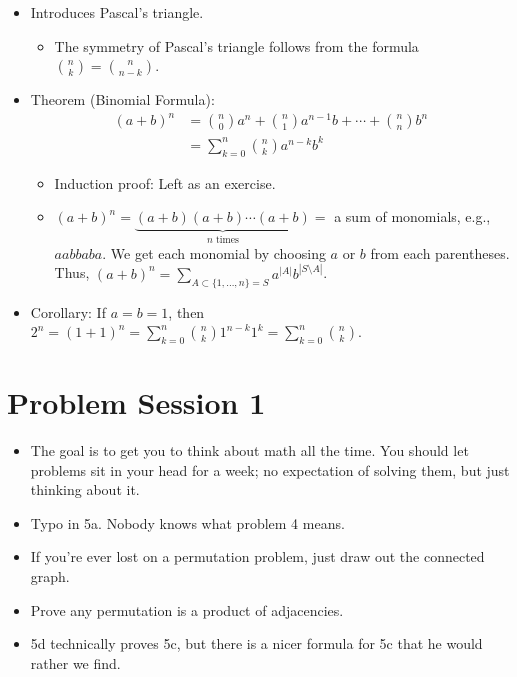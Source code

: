 \documentclass[../apprentice.tex]{subfiles}
\begin{document}
\begin{itemize}
\begin{itemize}
    \end{itemize}
    \item Introduces Pascal's triangle.
    \begin{itemize}
        \item The symmetry of Pascal's triangle follows from the formula $\binom{n}{k}=\binom{n}{n-k}$.
    \end{itemize}
    \item Theorem (Binomial Formula):
    \begin{align*}
        (a+b)^n &= \binom{n}{0}a^n+\binom{n}{1}a^{n-1}b+\cdots+\binom{n}{n}b^n\\
        &= \sum_{k=0}^n\binom{n}{k}a^{n-k}b^k
    \end{align*}
    \begin{itemize}
        \item Induction proof: Left as an exercise.
        \item $(a+b)^n=\underbrace{(a+b)(a+b)\cdots(a+b)}_{n\text{ times}}=$ a sum of monomials, e.g., $aabbaba$. We get each monomial by choosing $a$ or $b$ from each parentheses. Thus, $(a+b)^n=\sum_{A\subset\{1,\dots,n\}=S}a^{|A|}b^{|S\setminus A|}$.
    \end{itemize}
    \item Corollary: If $a=b=1$, then $2^n=(1+1)^n=\sum_{k=0}^n\binom{n}{k}1^{n-k}1^k=\sum_{k=0}^n\binom{n}{k}$.
\end{itemize}



\section{Problem Session 1}
\begin{itemize}
    \item {}The goal is to get you to think about math all the time. You should let problems sit in your head for a week; no expectation of solving them, but just thinking about it.
    \item Typo in 5a. Nobody knows what problem 4 means.
    \item If you're ever lost on a permutation problem, just draw out the connected graph.
    \item Prove any permutation is a product of adjacencies.
    \item 5d technically proves 5c, but there is a nicer formula for 5c that he would rather we find.
\end{itemize}
\end{document}

